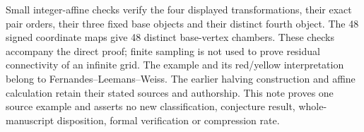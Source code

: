 \documentclass[11pt]{article}
\begin{document}
Small integer-affine checks verify the four displayed transformations,
their exact pair orders, their three fixed base objects and their
distinct fourth object. The 48 signed coordinate maps give 48 distinct
base-vertex chambers. These checks accompany the direct proof; finite
sampling is not used to prove residual connectivity of an infinite grid.
The example and its red/yellow interpretation belong to
Fernandes--Leemans--Weiss. The earlier halving construction and affine
calculation retain their stated sources and authorship. This note proves
one source example and asserts no new classification, conjecture result,
whole-manuscript disposition, formal verification or compression rate.
\end{document}
